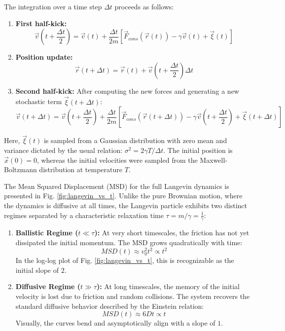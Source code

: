 The integration over a time step $\Delta t$ proceeds as follows:
\begin{enumerate}
	\item \textbf{First half-kick:}
	\begin{equation}
		\vec{v}(t + \frac{\Delta t}{2}) = \vec{v}(t) + \frac{\Delta t}{2m} \left[ \vec{F}_{cons}(\vec{r}(t)) - \gamma \vec{v}(t) + \vec{\xi}(t) \right]
	\end{equation}
	
	\item \textbf{Position update:}
	\begin{equation}
		\vec{r}(t + \Delta t) = \vec{r}(t) + \vec{v}(t + \frac{\Delta t}{2}) \Delta t
	\end{equation}
	
	\item \textbf{Second half-kick:}
	After computing the new forces and generating a new stochastic term $\vec{\xi}(t+\Delta t)$:
	\begin{equation}
		\vec{v}(t + \Delta t) = \vec{v}(t + \frac{\Delta t}{2}) + \frac{\Delta t}{2m} \left[ \vec{F}_{cons}(\vec{r}(t+\Delta t)) - \gamma \vec{v}(t + \frac{\Delta t}{2}) + \vec{\xi}(t+\Delta t) \right]
	\end{equation}
\end{enumerate}
Here, $\vec{\xi}(t)$ is sampled from a Gaussian distribution with zero mean and variance dictated by the usual relation: $\sigma^2 = 2\gamma T / \Delta t$. The initial position is $\vec x(0) = 0$, whereas the initial velocities were sampled from the Maxwell-Boltzmann distribution at temperature $T$.

The Mean Squared Displacement (MSD) for the full Langevin dynamics is presented in Fig. \ref{fig:langevin_vs_t}. Unlike the pure Brownian motion, where the dynamics is diffusive at all times, the Langevin particle exhibits two distinct regimes separated by a characteristic relaxation time $\tau = m/\gamma = \frac{1}{\gamma}$:

\begin{enumerate}
	\item \textbf{Ballistic Regime ($t \ll \tau$):} At very short timescales, the friction has not yet dissipated the initial momentum. The MSD grows quadratically with time:
	\begin{equation}
		MSD(t) \approx v_0^2 t^2 \propto t^2
	\end{equation}
	In the log-log plot of Fig. \ref{fig:langevin_vs_t}, this is recognizable as the initial slope of $2$.
	
	\item \textbf{Diffusive Regime ($t \gg \tau$):} At long timescales, the memory of the initial velocity is lost due to friction and random collisions. The system recovers the standard diffusive behavior described by the Einstein relation:
	\begin{equation}
		MSD(t) \approx 6 D t \propto t
	\end{equation}
	Visually, the curves bend and asymptotically align with a slope of $1$.
\end{enumerate}

